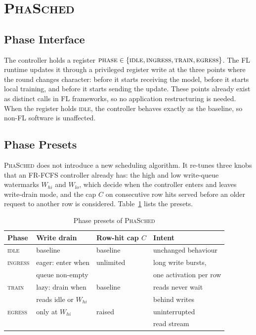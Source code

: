 \documentclass[conference]{IEEEtran}
\newcommand{\name}{\textsc{PhaSched}}
\begin{document}
\section{\name{}}
\subsection{Phase Interface}
The controller holds a register $\textsc{phase}\in\{\textsc{idle},\textsc{ingress},\textsc{train},\textsc{egress}\}$. The FL runtime updates it through a privileged register write at the three points where the round changes character: before it starts receiving the model, before it starts local training, and before it starts sending the update. These points already exist as distinct calls in FL frameworks, so no application restructuring is needed. When the register holds \textsc{idle}, the controller behaves exactly as the baseline, so non-FL software is unaffected.

\subsection{Phase Presets}
\name{} does not introduce a new scheduling algorithm. It re-tunes three knobs that an FR-FCFS controller already has: the high and low write-queue watermarks $W_{hi}$ and $W_{lo}$, which decide when the controller enters and leaves write-drain mode, and the cap $C$ on consecutive row hits served before an older request to another row is considered. Table~\ref{tab:presets} lists the presets.

\begin{table}[t]
\centering
\caption{Phase presets of \name{}}
\label{tab:presets}
\footnotesize
\begin{tabular}{@{}llll@{}}
\toprule
Phase & Write drain & Row-hit cap $C$ & Intent \\
\midrule
\textsc{idle} & baseline & baseline & unchanged behaviour \\
\textsc{ingress} & eager: enter when & unlimited & long write bursts, \\
 & queue non-empty & & one activation per row \\
\textsc{train} & lazy: drain when & baseline & reads never wait \\
 & reads idle or $W_{hi}$ & & behind writes \\
\textsc{egress} & only at $W_{hi}$ & raised & uninterrupted \\
 & & & read stream \\
\bottomrule
\end{tabular}
\end{table}
\end{document}
